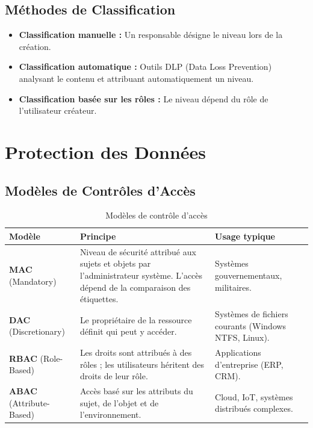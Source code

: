 \subsection{Méthodes de Classification}
\begin{itemize}
    \item \textbf{Classification manuelle :} Un responsable désigne le niveau lors de la création.
    \item \textbf{Classification automatique :} Outils DLP (Data Loss Prevention) analysant le contenu et attribuant automatiquement un niveau.
    \item \textbf{Classification basée sur les rôles :} Le niveau dépend du rôle de l'utilisateur créateur.
\end{itemize}

\section{Protection des Données}

\subsection{Modèles de Contrôles d'Accès}

\begin{table}[H]
\centering
\small
\begin{tabular}{p{2.5cm}p{4.5cm}p{4.5cm}}
    \toprule
    \textbf{Modèle} & \textbf{Principe} & \textbf{Usage typique} \\
    \midrule
    \textbf{MAC} (Mandatory) & Niveau de sécurité attribué aux sujets et objets par l'administrateur système. L'accès dépend de la comparaison des étiquettes. & Systèmes gouvernementaux, militaires. \\
    \midrule
    \textbf{DAC} (Discretionary) & Le propriétaire de la ressource définit qui peut y accéder. & Systèmes de fichiers courants (Windows NTFS, Linux). \\
    \midrule
    \textbf{RBAC} (Role-Based) & Les droits sont attribués à des rôles ; les utilisateurs héritent des droits de leur rôle. & Applications d'entreprise (ERP, CRM). \\
    \midrule
    \textbf{ABAC} (Attribute-Based) & Accès basé sur les attributs du sujet, de l'objet et de l'environnement. & Cloud, IoT, systèmes distribués complexes. \\
    \bottomrule
\end{tabular}
\caption{Modèles de contrôle d'accès}
\end{table}

